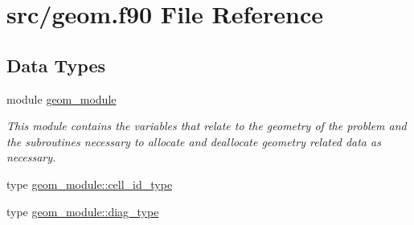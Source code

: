 \hypertarget{geom_8f90}{\section{src/geom.f90 File Reference}
\label{geom_8f90}
}
\subsection*{Data Types}
\begin{DoxyCompactItemize}
\item 
module \hyperlink{classgeom__module}{geom\-\_\-module}
\begin{DoxyCompactList}\small\item\em This module contains the variables that relate to the geometry of the problem and the subroutines necessary to allocate and deallocate geometry related data as necessary. \end{DoxyCompactList}\item 
type \hyperlink{structgeom__module_1_1cell__id__type}{geom\-\_\-module\-::cell\-\_\-id\-\_\-type}
\item 
type \hyperlink{structgeom__module_1_1diag__type}{geom\-\_\-module\-::diag\-\_\-type}
\end{DoxyCompactItemize}
